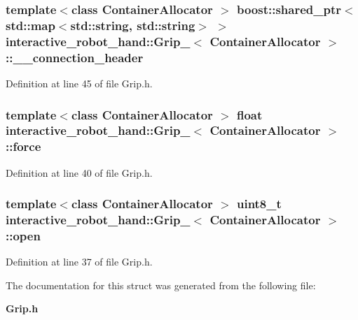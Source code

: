 \subsubsection[{\-\_\-\-\_\-connection\-\_\-header}]{\setlength{\rightskip}{0pt plus 5cm}template$<$class Container\-Allocator $>$ boost\-::shared\-\_\-ptr$<$std\-::map$<$std\-::string, std\-::string$>$ $>$ {\bf interactive\-\_\-robot\-\_\-hand\-::\-Grip\-\_\-}$<$ Container\-Allocator $>$\-::\-\_\-\-\_\-connection\-\_\-header}\label{structinteractive__robot__hand_1_1Grip___a5f49bd266c35295d8034bb9dd0c57d25}


Definition at line 45 of file Grip.\-h.

\subsubsection[{force}]{\setlength{\rightskip}{0pt plus 5cm}template$<$class Container\-Allocator $>$ float {\bf interactive\-\_\-robot\-\_\-hand\-::\-Grip\-\_\-}$<$ Container\-Allocator $>$\-::force}\label{structinteractive__robot__hand_1_1Grip___acb476de99fc7394128e05758d3ea528e}


Definition at line 40 of file Grip.\-h.

\subsubsection[{open}]{\setlength{\rightskip}{0pt plus 5cm}template$<$class Container\-Allocator $>$ uint8\-\_\-t {\bf interactive\-\_\-robot\-\_\-hand\-::\-Grip\-\_\-}$<$ Container\-Allocator $>$\-::open}\label{structinteractive__robot__hand_1_1Grip___a9e6a4798ad1fc4d1b10ec07e2fab784e}


Definition at line 37 of file Grip.\-h.



The documentation for this struct was generated from the following file\-:\begin{DoxyCompactItemize}
\item 
{\bf Grip.\-h}\end{DoxyCompactItemize}
